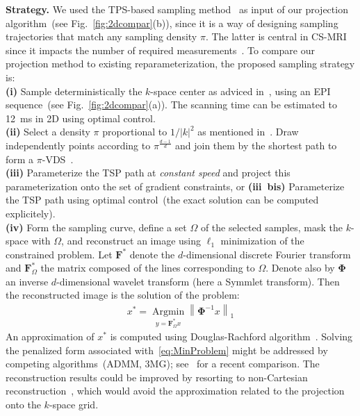 \documentclass{article}
\begin{document}
\noindent\textbf{Strategy.}
We used the TPS-based sampling method~\cite{Chauffert14} as input of our projection algorithm~(see Fig.~\ref{fig:2dcompar}(b)), since it is a way of designing sampling trajectories that match any sampling density $\pi$. The latter is central in CS-MRI since it impacts the number of required measurements~\cite{Adcock13,Krahmer12,Chauffert14}. To compare our projection method to existing reparameterization, the proposed sampling strategy is: \\
\noindent\textbf{(i)} Sample deterministically the $k$-space center as adviced in~\cite{Adcock13,Chauffert13,Chauffert14}, using an EPI sequence~(see Fig.~\ref{fig:2dcompar}(a)). The scanning time can be estimated to 12~ms in 2D using optimal control.\\
\textbf{(ii)} Select a density $\pi$ proportional to $1/|k|^2$ as mentioned in~\cite{Krahmer12,Chauffert14}. Draw independently points according to $\pi^{\frac{d-1}{d}}$ and join them by the shortest path to form a $\pi$-VDS~\cite{Chauffert14}.\\
\textbf{(iii)} Parameterize the TSP path at \emph{constant speed} and project this parameteri\-zation onto the set of gradient constraints, or
\textbf{(iii~bis)} Parameterize the TSP path using optimal control~(the exact solution can be computed explicitely).\\
\textbf{(iv)} Form the sampling curve, define a set $\Omega$ of the selected samples, mask the $k$-space with $\Omega$, and reconstruct an image using $\ell_1$ minimization of the constrained problem. Let $\mathbf{F}^*$ denote the $d$-dimensional discrete Fourier transform and $\mathbf{F}^*_\Omega$ the matrix composed of the lines corresponding to $\Omega$. Denote also by $\mathbf{\Phi}$ an inverse $d$-dimensional wavelet transform (here a Symmlet transform). Then the reconstructed image is the solution of the problem: 
\begin{align}
\label{eq:MinProblem}
x^* = \underset{y=\mathbf{F}^*_\Omega x}{\operatorname{Argmin}} \left\|\mathbf{\Phi}^{-1} x\right\|_1
\end{align}
An approximation of $x^*$ is computed using Douglas-Rachford algorithm~\cite{Combettes11b}. Solving the penalized form associated with~\eqref{eq:MinProblem} might be addressed by competing algorithms~(ADMM, 3MG); see~\cite{Florescu14} for a recent comparison. The reconstruction results could be improved by resorting to non-Cartesian reconstruction~\cite{Keiner09}, which would avoid the approximation related to the projection onto the $k$-space grid.
\end{document}
